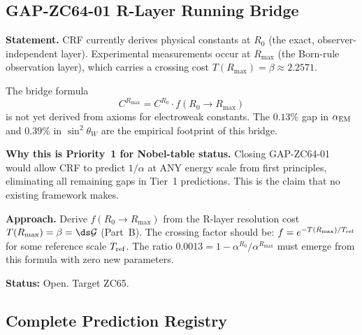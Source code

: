 \documentclass[12pt, a4paper]{article}
\renewcommand{\swsq}{\sin^2\!\theta_W}
\renewcommand{\aEM}{\alpha_{\rm EM}}
\begin{document}
\subsection{GAP-ZC64-01 \quad R-Layer Running Bridge}
\label{sec:gap}

\begin{openqbox}[title={GAP-ZC64-01: R-Layer Running Bridge
  (R$_0$ $\to$ R$_{\max}$, Priority Open)}]
\textbf{Statement.}
CRF currently derives physical constants at $R_0$ (the exact,
observer-independent layer).
Experimental measurements occur at $R_{\max}$ (the Born-rule
observation layer), which carries a crossing cost
$T(R_{\max}) = \beta \approx 2.2571$.

The bridge formula
\[
  C^{R_{\max}} = C^{R_0} \cdot f(R_0 \to R_{\max})
\]
is not yet derived from axioms for electroweak constants.
The $0.13\%$ gap in $\aEM$ and $0.39\%$ in $\swsq$
are the empirical footprint of this bridge.

\textbf{Why this is Priority~1 for Nobel-table status.}
Closing GAP-ZC64-01 would allow CRF to predict
$1/\alpha$ at ANY energy scale from first principles,
eliminating all remaining gaps in Tier~1 predictions.
This is the claim that no existing framework makes.

\textbf{Approach.}
Derive $f(R_0 \to R_{\max})$ from the R-layer
resolution cost $T(R_{\max}) = \beta = \ds\mathcal{G}$
(Part~B). The crossing factor should be:
$f = e^{-T(R_{\max})/T_{\rm ref}}$
for some reference scale $T_{\rm ref}$.
The ratio $0.0013 = 1 - \alpha^{R_0}/\alpha^{R_{\max}}$
must emerge from this formula with zero new parameters.

\textbf{Status:} Open. Target ZC65.
\end{openqbox}

\subsection{Complete Prediction Registry}
\label{sec:registry}
\end{document}
